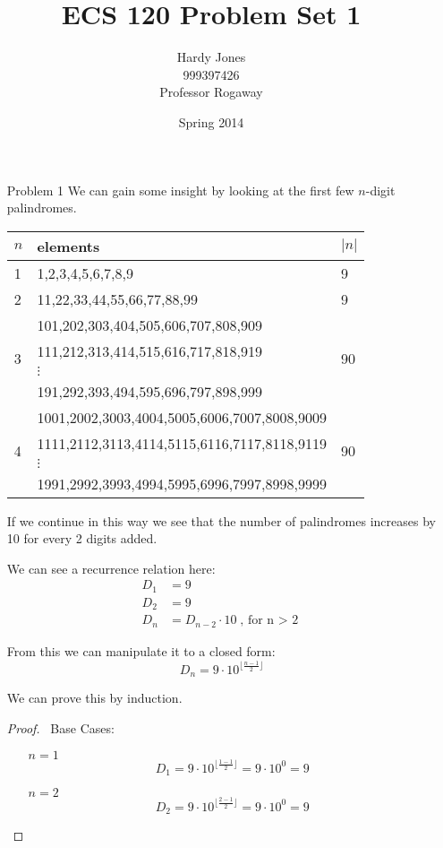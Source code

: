 \documentclass[12pt,letterpaper]{article}
\title{ECS 120 Problem Set 1\vspace{-2ex}}
\author{Hardy Jones\\
        999397426\\
        Professor Rogaway\vspace{-2ex}}
\date{Spring 2014}
\begin{document}
  \maketitle

  \begin{enumerate}
    \item[Problem 1]
      We can gain some insight by looking at the first few $n$-digit palindromes.

      \begin{tabular}{l | l | l}
        \multicolumn{1}{l}{$n$} & \multicolumn{1}{l}{elements} & \multicolumn{1}{l}{$|n|$} \\
        \hline
        1 & 1,2,3,4,5,6,7,8,9 & 9 \\
        2 & 11,22,33,44,55,66,77,88,99 & 9 \\
        \multirow{4}{*}{3} & 101,202,303,404,505,606,707,808,909 & \multirow{4}{*}{90} \\
                           & 111,212,313,414,515,616,717,818,919 & \\
                           & $\vdots$ & \\
                           & 191,292,393,494,595,696,797,898,999 & \\
        \multirow{4}{*}{4} & 1001,2002,3003,4004,5005,6006,7007,8008,9009 & \multirow{4}{*}{90} \\
                           & 1111,2112,3113,4114,5115,6116,7117,8118,9119 & \\
                           & $\vdots$ & \\
                           & 1991,2992,3993,4994,5995,6996,7997,8998,9999 &
      \end{tabular}

      If we continue in this way we see that the number of palindromes increases by 10 for every 2 digits added.

      We can see a recurrence relation here:
      \begin{align*}
        D_1 &= 9 \\
        D_2 &= 9 \\
        D_n &= D_{n-2} \cdot 10 \text{, for n $>$ 2}
      \end{align*}

      From this we can manipulate it to a closed form:
      \[D_n = 9 \cdot 10^{\lfloor \frac{n-1}{2} \rfloor}\]

      We can prove this by induction.

      \begin{proof} \
        Base Cases:
        \begin{enumerate}
          \item[$n = 1$]
            \[D_1 = 9 \cdot 10^{\lfloor \frac{1-1}{2} \rfloor} = 9 \cdot 10^0 = 9\]
          \item[$n = 2$]
            \[D_2 = 9 \cdot 10^{\lfloor \frac{2-1}{2} \rfloor} = 9 \cdot 10^0 = 9\]
        \end{enumerate}


\end{proof}
\end{enumerate}
\end{document}
